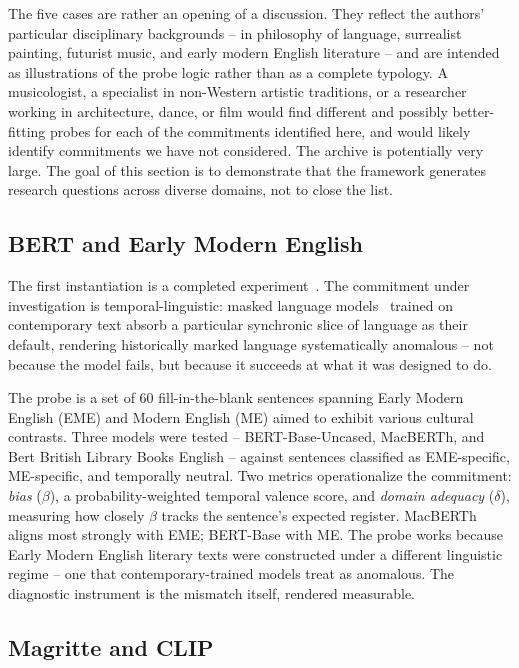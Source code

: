 \documentclass[
  twocolumn,
]{ceurart}
\begin{document}
The five cases are rather an opening of a discussion. They reflect the authors’ particular disciplinary backgrounds – in philosophy of language, surrealist painting, futurist music, and early modern English literature – and are intended as illustrations of the probe logic rather than as a complete typology. A musicologist, a specialist in non-Western artistic traditions, or a researcher working in architecture, dance, or film would find different and possibly better-fitting probes for each of the commitments identified here, and would likely identify commitments we have not considered. The archive is potentially very large. The goal of this section is to demonstrate that the framework generates research questions across diverse domains, not to close the list.

\subsection{BERT and Early Modern English}

The first instantiation is a completed experiment~\cite{cuscito_how_2024}. The commitment under investigation is temporal-linguistic: masked language models~\cite{devlin_bert_2019} trained on contemporary text absorb a particular synchronic slice of language as their default, rendering historically marked language systematically anomalous -- not because the model fails, but because it succeeds at what it was designed to do.

The probe is a set of 60 fill-in-the-blank sentences spanning Early Modern English (EME) and Modern English (ME) aimed to exhibit various cultural contrasts. Three models were tested -- BERT-Base-Uncased, MacBERTh, and Bert British Library Books English -- against sentences classified as EME-specific, ME-specific, and temporally neutral. Two metrics operationalize the commitment: \emph{bias} ($\beta$), a probability-weighted temporal valence score, and \emph{domain adequacy} ($\delta$), measuring how closely $\beta$ tracks the sentence's expected register. MacBERTh aligns most strongly with EME; BERT-Base with ME. The probe works because Early Modern English literary texts were constructed under a different linguistic regime -- one that contemporary-trained models treat as anomalous. The diagnostic instrument is the mismatch itself, rendered measurable.

\subsection{Magritte and CLIP}
\end{document}
